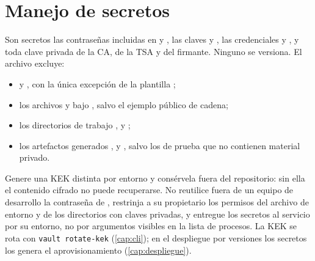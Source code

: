\section{Manejo de secretos}\label{sec:conf-secretos}

Son secretos las contraseñas incluidas en  y
, las claves  y
, las credenciales  y
, y toda clave privada de la CA, de la TSA y del
firmante. Ninguno se versiona. El archivo  excluye:

\begin{itemize}
  \item {} y , con la única excepción de la
        plantilla ;
  \item los archivos  y  bajo ,
        salvo el ejemplo público de cadena;
  \item los directorios de trabajo ,  y
        ;
  \item los artefactos generados ,  y
        , salvo los de prueba que no contienen material
        privado.
\end{itemize}

Genere una KEK distinta por entorno y consérvela fuera del repositorio: sin
ella el contenido cifrado no puede recuperarse. No reutilice fuera de un
equipo de desarrollo la contraseña  de
, restrinja a su propietario los permisos del archivo de
entorno y de los directorios con claves privadas, y entregue los secretos al
servicio por su entorno, no por argumentos visibles en la lista de procesos.
La KEK se rota con \texttt{vault rotate-kek} (\cref{cap:cli}); en el
despliegue por versiones los secretos los genera el aprovisionamiento
(\cref{cap:despliegue}).
